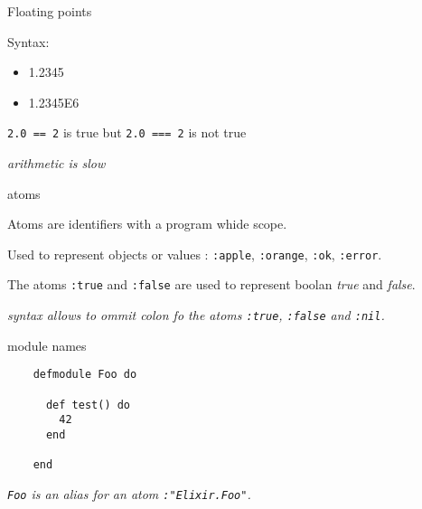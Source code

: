 \begin{frame}{Floating points}

  Syntax:
  \space{10pt}
  \begin{itemize}
  \item 1.2345 \pause
  \item 1.2345E6 \pause
  \end{itemize}

  \space{20pt}
  {\tt 2.0 == 2} is true  but {\tt 2.0 === 2} is not true

  \vspace{20pt}\pause
  {\em arithmetic is slow}  
\end{frame}

\begin{frame}{atoms}

  Atoms are identifiers with a program whide scope. \pause

  \vspace{20pt}
  Used to represent objects or values : {\tt :apple}, {\tt :orange}, {\tt :ok}, {\tt :error}. \pause

  \vspace{20pt}
  The atoms {\tt :true} and {\tt :false} are used to represent boolan {\em true} and {\em false}.\pause
  

  \vspace{20pt}
  {\em syntax allows to ommit colon fo the atoms {\tt :true}, {\tt :false} and {\tt :nil}.}
    
\end{frame}

\begin{frame}[fragile]{module names}

  \begin{lstlisting}
    defmodule Foo do

      def test() do
        42
      end

    end
  \end{lstlisting}

  \vspace{20pt}
  {\em {\tt Foo} is an alias for an atom {\tt :"Elixir.Foo"}.}
  
\end{frame}


